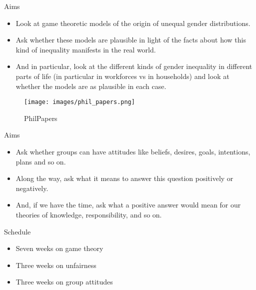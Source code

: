 \documentclass[
  ignorenonframetext,
]{beamer}
\providecommand{\tightlist}{%
  \setlength{\itemsep}{0pt}\setlength{\parskip}{0pt}}
\begin{document}
\begin{frame}{Aims}
\protect\hypertarget{aims-1}{}
\begin{itemize}
\tightlist
\item
  Look at game theoretic models of the origin of unequal gender
  distributions.
\item
  Ask whether these models are plausible in light of the facts about how
  this kind of inequality manifests in the real world.
\item
  And in particular, look at the different kinds of gender inequality in
  different parts of life (in particular in workforces vs in households)
  and look at whether the models are as plausible in each case.
\end{itemize}
\end{frame}

\begin{frame}
\begin{figure}
\centering
\texttt{[image: images/phil\_papers.png]}
\caption{PhilPapers}
\end{figure}
\end{frame}

\begin{frame}{Aims}
\protect\hypertarget{aims-2}{}
\begin{itemize}
\tightlist
\item
  Ask whether groups can have attitudes like beliefs, desires, goals,
  intentions, plans and so on.
\item
  Along the way, ask what it means to answer this question positively or
  negatively.
\item
  And, if we have the time, ask what a positive answer would mean for
  our theories of knowledge, responsibility, and so on.
\end{itemize}
\end{frame}

\begin{frame}{Schedule}
\protect\hypertarget{schedule}{}
\begin{itemize}
\tightlist
\item
  Seven weeks on game theory
\item
  Three weeks on unfairness
\item
  Three weeks on group attitudes
\end{itemize}
\end{frame}
\end{document}
